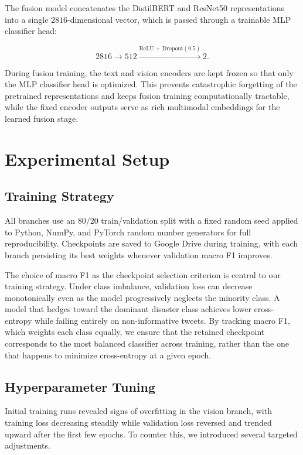 \documentclass[11pt,letterpaper]{article}
\begin{document}
The fusion model concatenates the DistilBERT and ResNet50 representations into a single $2816$-dimensional vector, which is passed through a trainable MLP classifier head:

\[
2816 \rightarrow 512 \xrightarrow{\text{ReLU + Dropout}(0.5)} 2.
\]

During fusion training, the text and vision encoders are kept frozen so that only the MLP classifier head is optimized. This prevents catastrophic forgetting of the pretrained representations and keeps fusion training computationally tractable, while the fixed encoder outputs serve as rich multimodal embeddings for the learned fusion stage.

\section{Experimental Setup}

\subsection{Training Strategy}
All branches use an $80/20$ train/validation split with a fixed random seed applied to Python, NumPy, and PyTorch random number generators for full reproducibility. Checkpoints are saved to Google Drive during training, with each branch persisting its best weights whenever validation macro F1 improves.

The choice of macro F1 as the checkpoint selection criterion is central to our training strategy. Under class imbalance, validation loss can decrease monotonically even as the model progressively neglects the minority class. A model that hedges toward the dominant disaster class achieves lower cross-entropy while failing entirely on non-informative tweets. By tracking macro F1, which weights each class equally, we ensure that the retained checkpoint corresponds to the most balanced classifier across training, rather than the one that happens to minimize cross-entropy at a given epoch.

\subsection{Hyperparameter Tuning}
Initial training runs revealed signs of overfitting in the vision branch, with training loss decreasing steadily while validation loss reversed and trended upward after the first few epochs. To counter this, we introduced several targeted adjustments.
\end{document}
